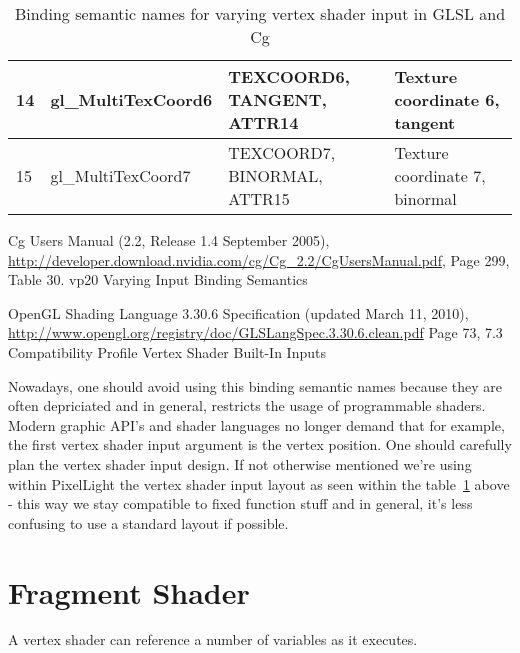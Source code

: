 \begin{table}[htb]
\begin{ThreePartTable}
\begin{tabular}{|l|l|p{}|l|}
				\hline
				14	&	gl\_MultiTexCoord6	&	TEXCOORD6, TANGENT, ATTR14	&	Texture coordinate 6, tangent\\
				\hline
				15	&	gl\_MultiTexCoord7	&	TEXCOORD7, BINORMAL, ATTR15	&	Texture coordinate 7, binormal\\
				\hline
			\bottomrule
		\end{tabular}
		\begin{tablenotes}
			\item[1] Cg Users Manual (2.2, Release 1.4 September 2005), \url{http://developer.download.nvidia.com/cg/Cg\_2.2/CgUsersManual.pdf}, Page 299, Table 30. vp20 Varying Input Binding Semantics
			\item[2] OpenGL Shading Language 3.30.6 Specification (updated March 11, 2010), \url{http://www.opengl.org/registry/doc/GLSLangSpec.3.30.6.clean.pdf} Page 73, 7.3 Compatibility Profile Vertex Shader Built-In Inputs
		\end{tablenotes}
		\caption{Binding semantic names for varying vertex shader input in GLSL and Cg}
		\label{Table:VaryingVertexShaderInput}
	\end{ThreePartTable}
\end{table}
Nowadays, one should avoid using this binding semantic names because they are often depriciated and in general, restricts the usage of programmable shaders. Modern graphic API's and shader languages no longer demand that for example, the first vertex shader input argument is the vertex position. One should carefully plan the vertex shader input design. If not otherwise mentioned we're using within PixelLight the vertex shader input layout as seen within the table~\ref{Table:VaryingVertexShaderInput} above - this way we stay compatible to fixed function stuff and in general, it's less confusing to use a standard layout if possible.




\section{Fragment Shader}
A vertex shader can reference a number of variables as it executes.
